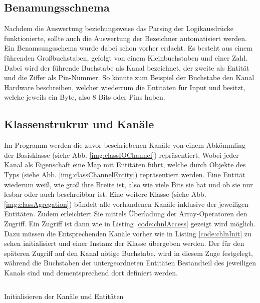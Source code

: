 \subsection{Benamungsschnema}\label{kap:ums:banamsung}
Nachdem die Auswertung beziehungsweise das Parsing der Logikausdrücke funktionierte, sollte auch die Auswertung der Bezeichner automatisiert werden. Ein Benamsungsschema wurde dabei schon vorher erdacht. Es besteht aus einem führenden Großbuchstaben, gefolgt von einem Kleinbuchstaben und einer Zahl. Dabei wird der führende Buchstabe als Kanal bezeichnet, der zweite als Entität und die Ziffer als Pin-Nummer. So könnte zum Beispiel der Buchstabe  den Kanal Hardware beschreiben, welcher  wiederrum die Entitäten  für Input und  besitzt, welche jeweils ein Byte, also 8 Bits oder Pins haben. 

\subsection{Klassenstrukrur und Kanäle}\label{kap:ums:klassen}
Im Programm werden die zuvor beschriebenen Kanäle von einem Abkömmling der Basisklasse  (siehe Abb. \ref{img:classIOChannel}) repräsentiert. Wobei jeder Kanal als Eigenschaft eine Map mit Entitäten führt, welche durch Objekte des Typs  (siehe Abb. \ref{img:classChannelEntity}) repräsentiert werden. Eine Entität wiederum weiß, wie groß ihre Breite ist, also wie viele Bits sie hat und ob sie nur lesbar oder auch beschreibbar ist. Eine weitere Klasse  (siehe Abb. \ref{img:classAgregation}) bündelt alle vorhandenen Kanäle inklusive der jeweiligen Entitäten. Zudem erleichtert Sie mittels Überladung der Array-Operatoren den Zugriff. Ein Zugriff ist dann wie in Listing \ref{code:chnlAccess} gezeigt wird möglich. Dazu müssen die Entsprechenden Kanäle vorher wie in Listing \ref{code:chlnInit} zu sehen initialisiert und einer Instanz der Klasse  übergeben werden. Der für den späteren Zugriff auf den Kanal nötige Buchstabe, wird in diesem Zuge festgelegt, während die Buchstaben der untergeordneten Entitäten Bestandteil des jeweiligen Kanals sind und dementsprechend dort definiert werden. 


\begin{listing}[H]
	\inputminted[numbersep=1pt,fontsize=\scriptsize,frame=single, firstline=364,lastline=369]{c}{./code/main-klassenstruktur.cpp}
	\caption{Initialisieren der Kanäle und Entitäten}
	\label{code:chlnInit}
\end{listing}


